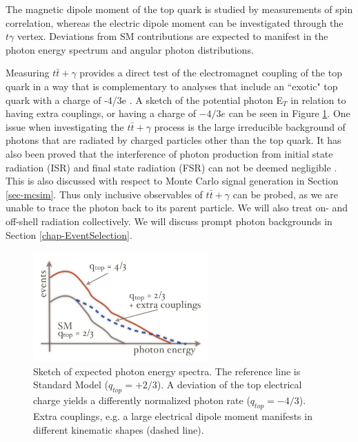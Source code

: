 The magnetic dipole moment of the top quark is studied by measurements of spin correlation, whereas the electric dipole moment can be investigated through the $t\gamma$ vertex. Deviations from SM contributions are expected to manifest in the photon energy spectrum and angular photon distributions.

Measuring $t\bar{t}+\gamma$ provides a direct test of the electromagnet coupling of the top quark in a way that is complementary to analyses that include an ``exotic" top quark with a charge of -4/3e \cite{top-charge}. A sketch of the potential photon E$_T$ in relation to having extra couplings, or having a charge of $-4/3e$ can be seen in Figure \ref{fig-TopChargeSketch}. One issue when investigating the $t\bar{t}+\gamma$ process is the large irreducible background of photons that are radiated by charged particles other than the top quark. It has also been proved that the interference of photon production from initial state radiation (ISR) and final state radiation (FSR) can not be deemed negligible \cite{topchargemeasurement}. This is also discussed with respect to Monte Carlo signal generation in Section \ref{sec-mcsim}. Thus only inclusive observables of $t\bar{t}+\gamma$ can be probed, as we are unable to trace the photon back to its parent particle. We will also treat on- and off-shell radiation collectively. We will discuss prompt photon backgrounds in Section \ref{chap-EventSelection}. 

\begin{figure} 
\begin{center}
\includegraphics[width=0.6\textwidth]{Figures/TopChargeHeiner.png}
\end{center}
\caption{Sketch of expected photon energy spectra. The reference line is Standard Model ($q_{top} = +2/3$). A deviation of the top electrical charge yields a differently normalized photon rate ($q_{top} = −4/3$). Extra couplings, e.g. a large electrical dipole moment manifests in different kinematic shapes (dashed line). \cite{heinerthesis}}
\label{fig-TopChargeSketch}
\end{figure}

